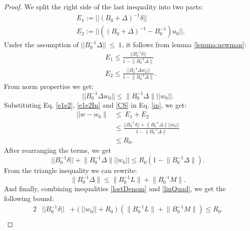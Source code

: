 \documentclass{vldb}
\begin{document}
\begin{appendix}
\begin{proof}
We split the right side of the last inequality into two parts:
\begin{equation}  \label{e1e2}
\begin{split}
& E_1:= ||(B_0+\Delta)^{-1}\delta|| \\
& E_2:= ||((B_0+\Delta)^{-1} - B_0^{-1})u_0||.
\end{split}
\end{equation}
Under the assumption of $||B_0^{-1}\Delta||\ \leq \ 1$,
it follows from lemma \ref{lemma:newman}:
\begin{equation} \label{e1e2In}
\begin{split}
& E_1 \leq \frac{||B_0^{-1}\delta||}{1-\Big \|B_0^{-1}\Delta\Big \|} \\
& E_2 \leq  \frac{|| B_0^{-1}\Delta w_0||}{1-\Big \|B_0^{-1}\Delta\Big \|}.
\end{split}
\end{equation}
From norm properties we get:
\begin{equation} \label{CS}
||B_0^{-1}\Delta w_0||  \leq  \Big \|B_0^{-1}\Delta \Big \| ||w_0||.
\end{equation}
Substituting Eq. \ref{e1e2}, \ref{e1e2In} and \ref{CS} in Eq. \ref{in}, we
get:
\begin{equation}
\begin{split}
|| w-w_0 \parallel & \leq \ E_1+E_2 \\
& \leq \frac{||B_0^{-1}\delta|| + \Big \|B_0^{-1}\Delta\Big \|||w_0||}{1 -\Big \|B_0^{-1}\Delta \Big \|} \\
& \leq R_0.
\end{split}
\end{equation}
After rearranging the terms, we get
\begin{equation} \label{lostDenom}
||B_0^{-1}\delta|| + \Big \|B_0^{-1}\Delta \Big \| ||w_0||
\leq R_0(1 -\Big \|B_0^{-1}\Delta\Big \|).
\end{equation}
From the triangle inequality we can rewrite:
\begin{equation} \label{linQuad}
\Big \|B_0^{-1}\Delta\Big \| \leq \Big \|B_0^{-1}L\Big \|+\Big \|B_0^{-1}M\Big \|.
\end{equation}
And finally, combining inequalities \ref{lostDenom} and \ref{linQuad},
we get the following bound:
\begin{alignat*}{2} \label{convexBound}
&||B_0^{-1}\delta|| &+ (||w_0||+R_0)(\Big \|B_0^{-1}L\Big \|+\Big \|B_0^{-1}M\Big \|)  \leq R_0. \\
&
\end{alignat*}
\end{proof}


\end{appendix}
\end{document}
